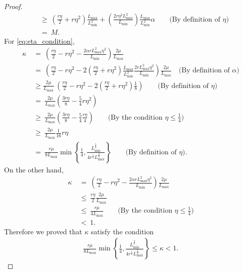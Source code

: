 \begin{proof}
\begin{align*}
        &~\geq~ \left( \frac{r \eta}{2} + r \eta^2 \right) \frac{L_{\max}}{L_{\min}^2} + \left( \frac{2 r \eta^2 L_{\max}^2}{ L_{\min} } \right) \frac{L_{\max}}{L_{\min}^2} \alpha \qquad \text{(By definition of $\eta$)} \\
        &~=~ M.
    \end{align*}
    For \eqref{eq:eta_condition},
    \begin{align*}
        \kappa &~=~ \left( \frac{r \eta }{2} - r \eta^2 - \frac{2 \alpha r L_{\max}^2 \eta^2}{L_{\min}} \right) \frac{2\mu}{ L_{\max}} \\
        &~=~ \left( \frac{r \eta }{2} - r \eta^2 - 2\left( \frac{r \eta}{2} + r \eta^2 \right) \frac{L_{\max}}{L_{\min}^2} \frac{2  r L_{\max}^2 \eta^2}{L_{\min}} \right) \frac{2\mu}{ L_{\max}} \quad \text{(By definition of $\alpha$)} \\
        &~\geq  \frac{2\mu}{ L_{\max}}~ \left( \frac{r \eta }{2} - r \eta^2 - 2\left( \frac{r \eta}{2} + r \eta^2 \right) \frac{1}{8} \right) \qquad \text{(By definition of $\eta$)} \\
        &~=~  \frac{2\mu}{ L_{\max}} \left( \frac{3r \eta}{8} - \frac{5}{4} r \eta^2 \right)  \\
        &~\geq~  \frac{2\mu}{ L_{\max}} \left( \frac{3r \eta}{8} - \frac{5}{4} \frac{r \eta}{4} \right) \qquad \text{(By the condition $\eta \leq \frac{1}{4}$)} \\
        &~\geq~  \frac{2\mu}{ L_{\max}} \frac{1}{16} r \eta \\
        &~=~  \frac{ r \mu }{ 8 L_{\max}} \min \left\{ \frac{1}{4}, \frac{L_{\min}^{\frac{3}{2}}}{4 r^{\frac{1}{2}} L_{\max}^{\frac{3}{2}} } \right\} \qquad \text{(By definition of $\eta$)}.
    \end{align*}
    On the other hand, 
    \begin{align*}
        \kappa &~=~ \left( \frac{r \eta }{2} - r \eta^2 - \frac{2 \alpha r L_{\max}^2 \eta^2}{L_{\min}} \right) \frac{2\mu}{ L_{\max}} \\
        &~\leq~ \frac{r \eta }{2} \frac{2\mu}{ L_{\max}} \\
        &~\leq~ \frac{r \mu}{4 L_{\max}}  \qquad \text{(By the condition $\eta \leq \frac{1}{4}$)} \\
        &~<~ 1.
    \end{align*}
    Therefore we proved that $\kappa$ satisfy the condition
    \begin{align}
      \frac{r \mu}{ 8 L_{\max}} \min \left\{ \frac{1}{4}, \frac{L_{\min}^{\frac{3}{2}}}{4 r^{\frac{1}{2}} L_{\max}^{\frac{3}{2}} } \right\} \leq  \kappa < 1. \label{eq:kappa_condition}

\end{align}
\end{proof}
